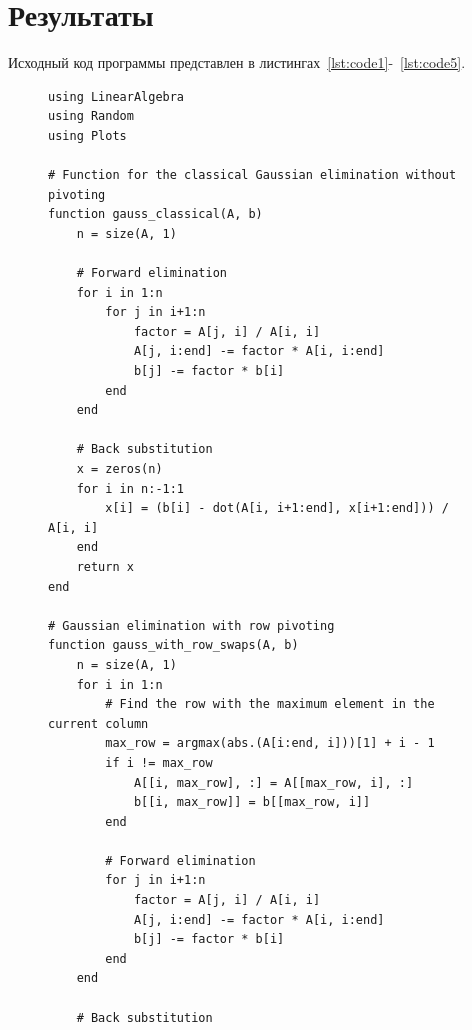 \documentclass[a4paper, 14pt]{extarticle}
\begin{document}
\section{Результаты}\label{Sect::res}

Исходный код программы представлен в листингах~\ref{lst:code1}-~\ref{lst:code5}.

\begin{figure}[!htb]
\begin{lstlisting}[caption={Реализация и сравнение разных вариаций метода Гаусса},label={lst:code1}]
using LinearAlgebra
using Random
using Plots

# Function for the classical Gaussian elimination without pivoting
function gauss_classical(A, b)
    n = size(A, 1)
    
    # Forward elimination
    for i in 1:n
        for j in i+1:n
            factor = A[j, i] / A[i, i]
            A[j, i:end] -= factor * A[i, i:end]
            b[j] -= factor * b[i]
        end
    end
    
    # Back substitution
    x = zeros(n)
    for i in n:-1:1
        x[i] = (b[i] - dot(A[i, i+1:end], x[i+1:end])) / A[i, i]
    end
    return x
end

# Gaussian elimination with row pivoting
function gauss_with_row_swaps(A, b)
    n = size(A, 1)
    for i in 1:n
        # Find the row with the maximum element in the current column
        max_row = argmax(abs.(A[i:end, i]))[1] + i - 1
        if i != max_row
            A[[i, max_row], :] = A[[max_row, i], :]
            b[[i, max_row]] = b[[max_row, i]]
        end

        # Forward elimination
        for j in i+1:n
            factor = A[j, i] / A[i, i]
            A[j, i:end] -= factor * A[i, i:end]
            b[j] -= factor * b[i]
        end
    end

    # Back substitution
\end{lstlisting}
\end{figure}
\end{document}
